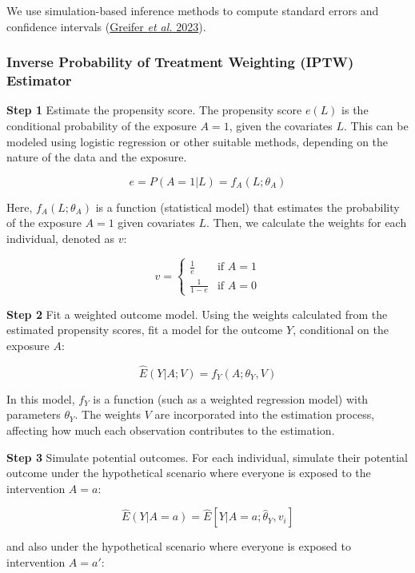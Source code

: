 \documentclass[
  singlecolumn]{article}
\begin{document}
We use simulation-based inference methods to compute standard errors and
confidence intervals (\protect\hyperlink{ref-greifer2023}{Greifer
\emph{et al.} 2023}).

\hypertarget{inverse-probability-of-treatment-weighting-iptw-estimator}{%
\subsubsection{\texorpdfstring{\textbf{Inverse Probability of Treatment
Weighting (IPTW)
Estimator}}{Inverse Probability of Treatment Weighting (IPTW) Estimator}}\label{inverse-probability-of-treatment-weighting-iptw-estimator}}

\textbf{Step 1} Estimate the propensity score. The propensity score
\(e(L)\) is the conditional probability of the exposure \(A = 1\), given
the covariates \(L\). This can be modeled using logistic regression or
other suitable methods, depending on the nature of the data and the
exposure.

\[e = P(A = 1 | L) = f_A(L; \theta_A)\]

Here, \(f_A(L; \theta_A)\) is a function (statistical model) that
estimates the probability of the exposure \(A = 1\) given covariates
\(L\). Then, we calculate the weights for each individual, denoted as
\(v\):

\[
v = 
\begin{cases} 
\frac{1}{e} & \text{if } A = 1 \\
\frac{1}{1-e} & \text{if } A = 0 
\end{cases}
\]

\textbf{Step 2} Fit a weighted outcome model. Using the weights
calculated from the estimated propensity scores, fit a model for the
outcome \(Y\), conditional on the exposure \(A\):

\[ \hat{E}(Y|A; V) = f_Y(A; \theta_Y, V) \]

In this model, \(f_Y\) is a function (such as a weighted regression
model) with parameters \(\theta_Y\). The weights \(V\) are incorporated
into the estimation process, affecting how much each observation
contributes to the estimation.

\textbf{Step 3} Simulate potential outcomes. For each individual,
simulate their potential outcome under the hypothetical scenario where
everyone is exposed to the intervention \(A=a\):

\[\hat{E}(Y|A=a)  = \hat{E}[Y|A=a; \hat{\theta}_Y,  v_i]\]

and also under the hypothetical scenario where everyone is exposed to
intervention \(A=a'\):
\end{document}
